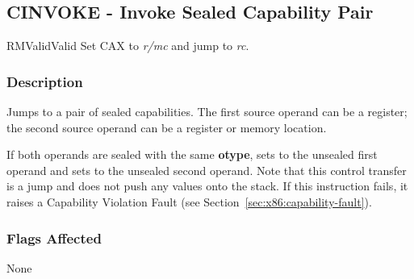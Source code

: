 \clearpage
{}
{}
\subsection*{CINVOKE - Invoke Sealed Capability Pair}

\begin{x86opcodetable}
  {RM}{Valid}{Valid}
  {Set CAX to \emph{r/mc} and jump to \emph{rc}.}
\end{x86opcodetable}

\begin{x86opentable}
\end{x86opentable}

\subsubsection*{Description}

Jumps to a pair of sealed capabilities.  The first source operand can
be a register; the second source operand can be a register or memory
location.

If both operands are sealed with the same \textbf{otype}, sets \CIP{}
to the unsealed first operand and sets \CAX{} to the unsealed second
operand.  Note that this control transfer is a jump and does not push
any values onto the stack.  If this instruction fails, it raises a
Capability Violation Fault (see
Section~\ref{sec:x86:capability-fault}).

\subsubsection*{Flags Affected}

None
